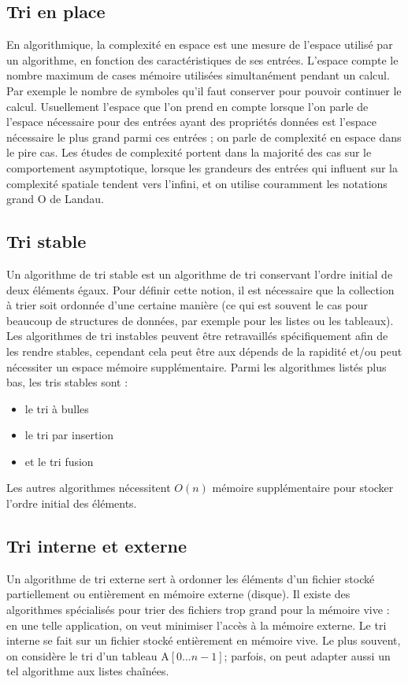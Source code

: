 \documentclass[11pt,a4paper]{article}
\begin{document}
\subsection{Tri en place}
En algorithmique, la complexité en espace est une mesure de l'espace utilisé par un algorithme, en fonction des caractéristiques de ses entrées.
L'espace compte le nombre maximum de cases mémoire utilisées simultanément pendant un calcul. Par exemple le nombre de symboles qu'il faut
conserver pour pouvoir continuer le calcul. Usuellement l'espace que l'on prend en compte lorsque l'on parle de l'espace nécessaire pour des
entrées ayant des propriétés données est l'espace nécessaire le plus grand parmi ces entrées ; on parle de complexité en espace dans le pire cas.
Les études de complexité portent dans la majorité des cas sur le comportement asymptotique, lorsque les grandeurs des entrées qui influent sur la
complexité spatiale tendent vers l'infini, et on utilise couramment les notations grand O de Landau.

\subsection{Tri stable}
Un algorithme de tri stable est un algorithme de tri conservant l'ordre initial de deux éléments égaux. Pour définir cette notion, il est nécessaire
que la collection à trier soit ordonnée d'une certaine manière (ce qui est souvent le cas pour beaucoup de structures de données, par exemple pour
les listes ou les tableaux). Les algorithmes de tri instables peuvent être retravaillés spécifiquement afin de les rendre stables, cependant cela peut
être aux dépends de la rapidité et/ou peut nécessiter un espace mémoire supplémentaire. Parmi les algorithmes listés plus bas, les tris stables sont :
\begin{itemize}
    \item le tri à bulles
    \item le tri par insertion
    \item et le tri fusion
\end{itemize}
Les autres algorithmes nécessitent $\displaystyle{O(n)}$ mémoire supplémentaire pour stocker l'ordre initial des éléments.

\subsection{Tri interne et externe}
Un algorithme de tri externe sert à ordonner les éléments d’un fichier stocké partiellement ou entièrement en mémoire externe
(disque). Il existe des algorithmes spécialisés pour trier des fichiers trop grand
pour la mémoire vive : en une telle application, on veut minimiser l’accès à la
mémoire externe. Le tri interne se fait sur un fichier stocké entièrement en
mémoire vive. Le plus souvent, on considère le tri d’un tableau  A$\left[ 0...n-1 \right]$;
parfois, on peut adapter aussi un tel algorithme aux listes chaînées.
\end{document}
